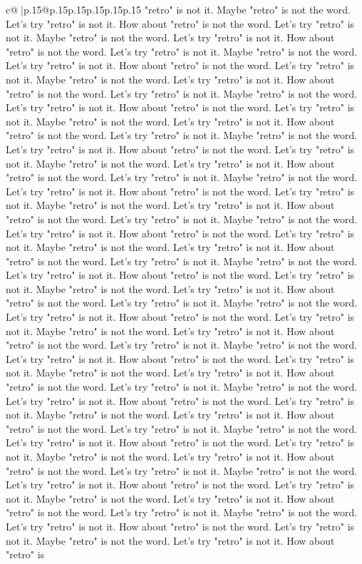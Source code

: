 \documentclass{article}
\begin{document}
{\begin{supertabular}{c@{$\;$}|p{.15\linewidth}@{}p{.15\linewidth}p{.15\linewidth}p{.15\linewidth}p{.15\linewidth}p{.15\linewidth}}
{{{"retro" is not it. Maybe "retro" is not the word. Let's try "retro" is not it. How about "retro" is not the word. Let's try "retro" is not it. Maybe "retro" is not the word. Let's try "retro" is not it. How about "retro" is not the word. Let's try "retro" is not it. Maybe "retro" is not the word. Let's try "retro" is not it. How about "retro" is not the word. Let's try "retro" is not it. Maybe "retro" is not the word. Let's try "retro" is not it. How about "retro" is not the word. Let's try "retro" is not it. Maybe "retro" is not the word. Let's try "retro" is not it. How about "retro" is not the word. Let's try "retro" is not it. Maybe "retro" is not the word. Let's try "retro" is not it. How about "retro" is not the word. Let's try "retro" is not it. Maybe "retro" is not the word. Let's try "retro" is not it. How about "retro" is not the word. Let's try "retro" is not it. Maybe "retro" is not the word. Let's try "retro" is not it. How about "retro" is not the word. Let's try "retro" is not it. Maybe "retro" is not the word. Let's try "retro" is not it. How about "retro" is not the word. Let's try "retro" is not it. Maybe "retro" is not the word. Let's try "retro" is not it. How about "retro" is not the word. Let's try "retro" is not it. Maybe "retro" is not the word. Let's try "retro" is not it. How about "retro" is not the word. Let's try "retro" is not it. Maybe "retro" is not the word. Let's try "retro" is not it. How about "retro" is not the word. Let's try "retro" is not it. Maybe "retro" is not the word. Let's try "retro" is not it. How about "retro" is not the word. Let's try "retro" is not it. Maybe "retro" is not the word. Let's try "retro" is not it. How about "retro" is not the word. Let's try "retro" is not it. Maybe "retro" is not the word. Let's try "retro" is not it. How about "retro" is not the word. Let's try "retro" is not it. Maybe "retro" is not the word. Let's try "retro" is not it. How about "retro" is not the word. Let's try "retro" is not it. Maybe "retro" is not the word. Let's try "retro" is not it. How about "retro" is not the word. Let's try "retro" is not it. Maybe "retro" is not the word. Let's try "retro" is not it. How about "retro" is not the word. Let's try "retro" is not it. Maybe "retro" is not the word. Let's try "retro" is not it. How about "retro" is not the word. Let's try "retro" is not it. Maybe "retro" is not the word. Let's try "retro" is not it. How about "retro" is not the word. Let's try "retro" is not it. Maybe "retro" is not the word. Let's try "retro" is not it. How about "retro" is not the word. Let's try "retro" is not it. Maybe "retro" is not the word. Let's try "retro" is not it. How about "retro" is not the word. Let's try "retro" is not it. Maybe "retro" is not the word. Let's try "retro" is not it. How about "retro" is not the word. Let's try "retro" is not it. Maybe "retro" is not the word. Let's try "retro" is not it. How about "retro" is not the word. Let's try "retro" is not it. Maybe "retro" is not the word. Let's try "retro" is not it. How about "retro" is not the word. Let's try "retro" is not it. Maybe "retro" is not the word. Let's try "retro" is not it. How about "retro" is }}}
\end{supertabular}}
\end{document}
